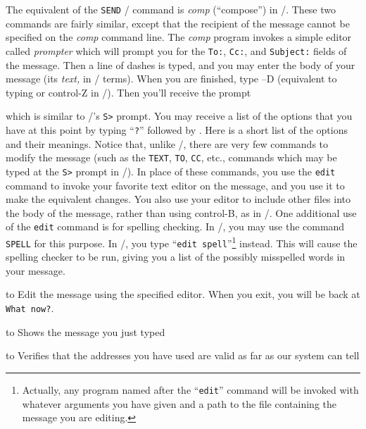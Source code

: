 The equivalent of the {\tt SEND} \MM/ command is {\it comp\/} (``compose'')
in \MH/.  These two commands are fairly similar, except that the recipient of
the message cannot be specified on the {\it comp\/} command line.
The {\it comp\/} program invokes a simple editor called {\it prompter\/}
which will prompt you for the {\tt To:}, {\tt Cc:},
and {\tt Subject:} fields of the message.  Then a line of dashes is typed,
and you may enter the body of your message (its {\em text,} in \MM/ terms).
When you are finished, type --D (equivalent to typing  or
control-Z in \MM/).  Then you'll receive the prompt


which is similar to \MM/'s {\tt S>} prompt.  You may receive a list of the
options that you have at this point by typing ``{\tt?}'' followed by
.  Here is a short list of the options and their meanings.
Notice that, unlike \MM/, there are very few commands to modify the message
(such as the {\tt TEXT}, {\tt TO}, {\tt CC}, etc., commands which may be
typed at the {\tt S>} prompt in \MM/).  In place of these commands, you use
the {\tt edit} command to invoke your favorite text editor on the message,
and you use it to make the equivalent changes.  You also use your editor
to include other files into the body of the message, rather than using
control-B, as in \MM/.  One additional use of the {\tt edit} command is
for spelling checking.  In \MM/, you may use the command {\tt SPELL} 
for this purpose.  
In \MH/, you type ``{\tt edit spell}''\footnote{ Actually, any
program named after the ``{\tt edit}'' command will be invoked with
whatever arguments you have given and a path to the file containing
the message you are editing.} instead.  This will
cause the spelling checker to be run, giving you a list of the possibly
misspelled words in your message.

\bigskip

\begingroup
\def\titem[#1]{\par\hangafter=1\hangindent=1.4in\noindent
	\hbox to\hangindent{\hfil#1\qquad}\ignorespaces}

\titem[\tt edit \it editor\/] Edit the message using the specified
				editor.  When you exit, you will be
				back at \verb|What now?|.

\titem[\tt list] Shows the message you just typed

\titem[\tt whom -check] Verifies that the addresses you have
				used are valid as far as our system
				can tell

